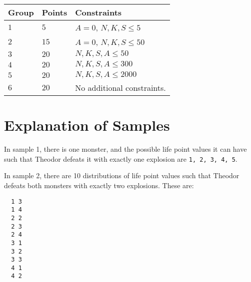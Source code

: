 \noindent
\begin{tabular}{| l | l | p{12cm} |}
  \hline
  \textbf{Group} & \textbf{Points} & \textbf{Constraints} \\ \hline
  $1$    & $5$        & $A = 0$, $N, K, S \leq 5$ \\ \hline
  $2$    & $15$       & $A = 0$, $N, K, S \leq 50$ \\ \hline
  $3$    & $20$       & $N, K, S, A \leq 50$ \\ \hline
  $4$    & $20$       & $N, K, S, A \leq 300$ \\ \hline
  $5$    & $20$       & $N, K, S, A \leq 2000$ \\ \hline
  $6$    & $20$       & No additional constraints. \\ \hline
\end{tabular}

\section*{Explanation of Samples}
In sample 1, there is one monster, and the possible life point values it can have such that
Theodor defeats it with exactly one explosion are \verb+1, 2, 3, 4, 5+.


In sample 2, there are 10 distributions of life point values such that Theodor defeats both monsters
with exactly two explosions. These are:
\begin{verbatim}
  1 3
  1 4
  2 2
  2 3
  2 4
  3 1
  3 2
  3 3
  4 1
  4 2
\end{verbatim}

